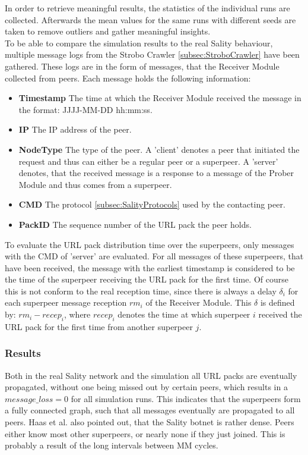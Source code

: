 \documentclass{article}
\begin{document}
In order to retrieve meaningful results, the statistics of the individual runs are collected. Afterwards the mean values for the same runs with different seeds are taken to remove outliers and gather meaningful insights. \\

To be able to compare the simulation results to the real Sality behaviour, multiple message logs from the Strobo Crawler \ref{subsec:StroboCrawler} have been gathered. These logs are in the form of messages, that the Receiver Module collected from peers. Each message holds the following information:

\begin{itemize}
    \item \textbf{Timestamp}  The time at which the Receiver Module received the message in the format: JJJJ-MM-DD hh:mm:ss.
    \item \textbf{IP}  The IP address of the peer.
    \item \textbf{NodeType}  The type of the peer. A 'client' denotes a peer that initiated the request and thus can either be a regular peer or a superpeer. A 'server' denotes, that the received message is a response to a message of the Prober Module and thus comes from a superpeer.
    \item \textbf{CMD}  The protocol \ref{subsec:SalityProtocols} used by the contacting peer. 
    \item \textbf{PackID}  The sequence number of the URL pack the peer holds.
\end{itemize}

To evaluate the URL pack distribution time over the superpeers, only messages with the CMD of 'server' are evaluated. For all messages of these superpeers, that have been received, the message with the earliest timestamp is considered to be the time of the superpeer receiving the URL pack for the first time. Of course this is not conform to the real reception time, since there is always a delay $\delta_{i}$ for each superpeer message reception $rm_{i}$ of the Receiver Module. This $\delta$ is defined by: $rm_{i} - recep_{i}$, where $recep_{i}$ denotes the time at which superpeer $i$ received the URL pack for the first time from another superpeer $j$.

\subsubsection{Results} \label{subsec:distrMethodsResults}
Both in the real Sality network and the simulation all URL packs are eventually propagated, without one being missed out by certain peers, which results in a $message\_loss = 0$ for all simulation runs. This indicates that the superpeers form a fully connected graph, such that all messages eventually are propagated to all peers. Haas et al. \cite{haas2016resilience} also pointed out, that the Sality botnet is rather dense. Peers either know most other superpeers, or nearly none if they just joined. This is probably a result of the long intervals between MM cycles. \\
\end{document}
